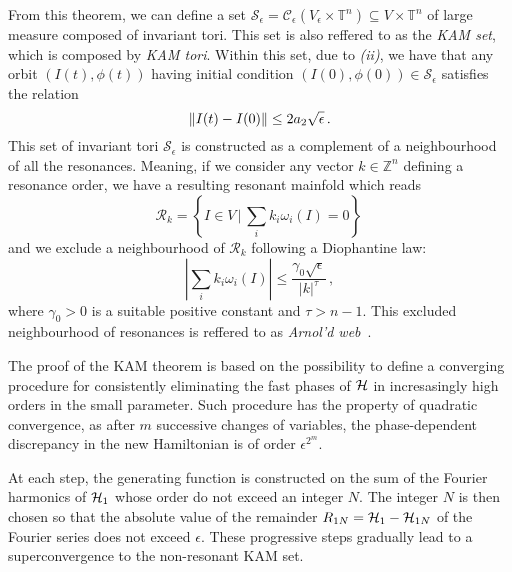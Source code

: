 From this theorem, we can define a set $\mathcal{S}_\epsilon = \mathcal{C}_\epsilon(V_\epsilon \times \mathbb{T}^n) \subseteq V \times \mathbb{T}^n$ of large measure composed of invariant tori. This set is also reffered to as the \textit{KAM set}, which is composed by \textit{KAM tori}. Within this set, due to \textit{(ii)}, we have that any orbit $(I(t), \phi(t))$ having initial condition $(I(0), \phi(0)) \in \mathcal{S}_\epsilon$ satisfies the relation
\begin{equation}
    \norm{I(t) - I(0)} \leq 2 a_2 \sqrt{\epsilon} \,.
\end{equation}
This set of invariant tori $\mathcal{S}_\epsilon$ is constructed as a complement of a neighbourhood of all the resonances. Meaning, if we consider any vector $k\in \mathbb{Z}^n$ defining a resonance order, we have a resulting resonant mainfold which reads
\begin{equation}
    \mathcal{R}_k = \left\{I\in V \, \big| \, \sum_i k_i \omega_i(I) = 0\right\} \,
\end{equation}  
and we exclude a neighbourhood of $\mathcal{R}_k$ following a Diophantine law:
\begin{equation}
    \left|\sum_i k_i \omega_i(I)\right| \leq \frac{\gamma_0 \sqrt{\epsilon}}{|k|^\tau} \,,
\end{equation}
where $\gamma_0 > 0$ is a suitable positive constant and $\tau > n-1$. This excluded neighbourhood of resonances is reffered to as \textit{Arnol'd web}~\cite{}.

The proof of the KAM theorem is based on the possibility to define a converging procedure for consistently eliminating the fast phases of $\mathcal{H}$ in incresasingly high orders in the small parameter. Such procedure has the property of quadratic convergence, as after $m$ successive changes of variables, the phase-dependent discrepancy in the new Hamiltonian is of order $\epsilon^{2^m}$.

At each step, the generating function is constructed on the sum of the Fourier harmonics of $\mathcal{H}_1$ whose order do not exceed an integer $N$. The integer $N$ is then chosen so that the absolute value of the remainder $R_{1N} = \mathcal{H}_1 - \mathcal{H}_{1N}$ of the Fourier series does not exceed $\epsilon$. These progressive steps gradually lead to a superconvergence to the non-resonant KAM set.


